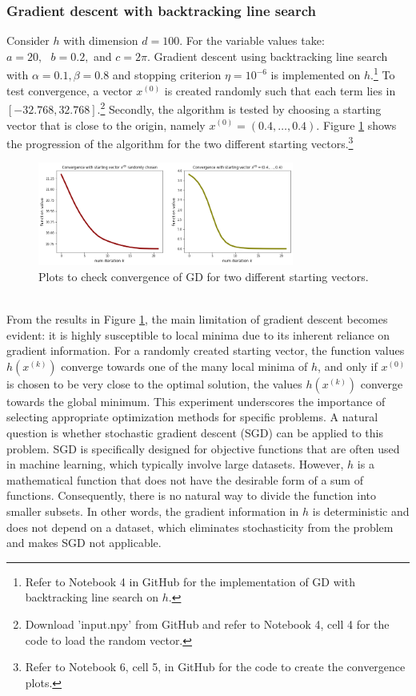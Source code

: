 \subsubsection{Gradient descent with backtracking line search} Consider $h$ with dimension $d=100.$ For the variable values take: $a = 20,\text{ }b = 0.2,$ and $c = 2\pi$. Gradient descent using backtracking line search with $\alpha = 0.1, \beta = 0.8$ and stopping criterion $\eta = 10^{-6}$ is implemented on $h.$\footnote{Refer to Notebook 4 in GitHub \cite{ThesisCode2023} for the implementation of GD with backtracking line search on $h.$} To test convergence, a vector $x^{(0)}$ is created randomly such that each term lies in $[-32.768, 32.768]$.\footnote{Download 'input.npy' from GitHub \cite{ThesisCode2023} and refer to Notebook 4, cell 4 for the code to load the random vector.} Secondly, the algorithm is tested by choosing a starting vector that is close to the origin, namely $x^{(0)}=(0.4,\ldots,0.4).$ Figure \ref{fig:Ackelys_conv_check} shows the progression of the algorithm for the two different starting vectors.\footnote{Refer to Notebook 6, cell 5, in GitHub \cite{ThesisCode2023}  for the code to create the convergence plots.}
\begin{figure}[h!]
    \centering
        \includegraphics[width=0.75\textwidth]{Pictures/Merged_conv_ackleys.png}
    \caption{Plots to check convergence of GD for two different starting vectors.}\label{fig:Ackelys_conv_check}
\end{figure}\\
\newpage
From the results in Figure \ref{fig:Ackelys_conv_check}, the main limitation of gradient descent becomes evident: it is highly susceptible to local minima due to its inherent reliance on gradient information. For a randomly created starting vector, the function values $h(x^{(k)})$ converge towards one of the many local minima of $h$, and only if $x^{(0)}$ is chosen to be very close to the optimal solution, the values $h(x^{(k)})$ converge towards the global minimum. This experiment underscores the importance of selecting appropriate optimization methods for specific problems. A natural question is whether stochastic gradient descent (SGD) can be applied to this problem. SGD is specifically designed for objective functions that are often used in machine learning, which typically involve large datasets. However, $h$ is a mathematical function that does not have the desirable form of a sum of functions. Consequently, there is no natural way to divide the function into smaller subsets. In other words, the gradient information in $h$ is deterministic and does not depend on a dataset, which eliminates stochasticity from the problem and makes SGD not applicable.

